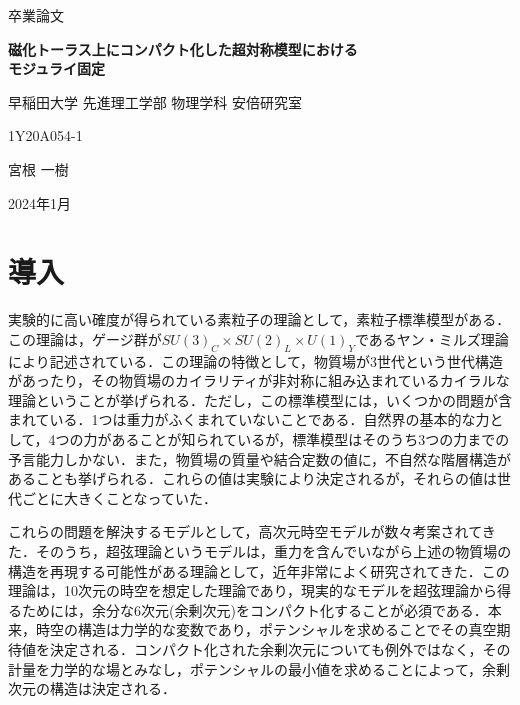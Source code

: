\documentclass[a4paper,uplatex,dvipdfmx]{jsarticle}
\theoremstyle{definition}
\begin{document}
\begin{titlepage}
\begin{center}
\vspace*{10truemm}
\Large
卒業論文

\bigskip\bigskip
\textbf{\LARGE 
磁化トーラス上にコンパクト化した超対称模型における
\\
モジュライ固定
}

\vspace*{90truemm}
\large
早稲田大学 先進理工学部 物理学科 安倍研究室

\medskip
\large
1Y20A054-1

\bigskip
\Large
宮根 一樹

\bigskip\bigskip\bigskip\bigskip
\large
2024年1月
\end{center}
\end{titlepage}

\setcounter{tocdepth}{3}
\tableofcontents

\clearpage
\section{導入}

実験的に高い確度が得られている素粒子の理論として，素粒子標準模型がある．この理論は，ゲージ群が$SU(3)_{C}\times SU(2)_{L}\times U(1)_{Y}$であるヤン・ミルズ理論により記述されている．この理論の特徴として，物質場が3世代という世代構造があったり，その物質場のカイラリティが非対称に組み込まれているカイラルな理論ということが挙げられる．ただし，この標準模型には，いくつかの問題が含まれている．1つは重力がふくまれていないことである．自然界の基本的な力として，4つの力があることが知られているが，標準模型はそのうち3つの力までの予言能力しかない．また，物質場の質量や結合定数の値に，不自然な階層構造があることも挙げられる．これらの値は実験により決定されるが，それらの値は世代ごとに大きくことなっていた．

これらの問題を解決するモデルとして，高次元時空モデルが数々考案されてきた．そのうち，超弦理論というモデルは，重力を含んでいながら上述の物質場の構造を再現する可能性がある理論として，近年非常によく研究されてきた．この理論は，10次元の時空を想定した理論であり，現実的なモデルを超弦理論から得るためには，余分な6次元(余剰次元)をコンパクト化することが必須である．本来，時空の構造は力学的な変数であり，ポテンシャルを求めることでその真空期待値を決定される．コンパクト化された余剰次元についても例外ではなく，その計量を力学的な場とみなし，ポテンシャルの最小値を求めることによって，余剰次元の構造は決定される．
\end{document}
